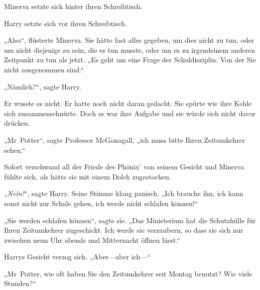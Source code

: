 Minerva setzte sich hinter ihren Schreibtisch.

Harry setzte sich vor ihren Schreibtisch.

„Also“, flüsterte Minerva. Sie hätte fast alles gegeben, um dies nicht zu tun, oder um nicht diejenige zu sein, die es tun musste, oder um es zu irgendeinem anderen Zeitpunkt zu tun als jetzt. „Es geht um eine Frage der Schuldisziplin. Von der Sie nicht ausgenommen sind.“

„Nämlich?“, sagte Harry.

Er wusste es nicht. Er hatte noch nicht daran gedacht. Sie spürte wie ihre Kehle sich zusammenschnürte. Doch es war ihre Aufgabe und sie würde sich nicht davor drücken.

„Mr~Potter“, sagte Professor McGonagall, „ich muss bitte Ihren Zeitumkehrer sehen.“

Sofort verschwand all der Friede des Phönix’ von seinem Gesicht und Minerva fühlte sich, als hätte sie mit einem Dolch zugestochen.

„\emph{Nein!}“, sagte Harry. Seine Stimme klang panisch. „Ich brauche ihn, ich kann sonst nicht zur Schule gehen, ich werde nicht schlafen können!“

„Sie werden schlafen können“, sagte sie. „Das Ministerium hat die Schutzhülle für Ihren Zeitumkehrer zugeschickt. Ich werde sie verzaubern, so dass sie sich nur zwischen neun Uhr abends und Mitternacht öffnen lässt.“

Harrys Gesicht verzog sich. „Aber—aber ich—“

„Mr~Potter, wie oft haben Sie den Zeitumkehrer seit Montag benutzt? Wie viele Stunden?“

